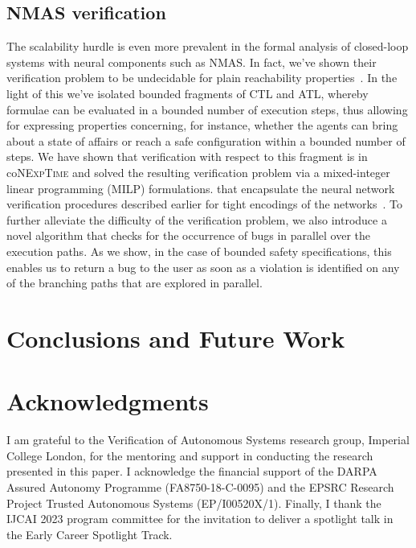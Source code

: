 \documentclass{article}
\newcommand{\conexptime}{co\nexptime}
\newcommand{\nexptime}{\textsc{NExpTime}\xspace}
\begin{document}
\subsection{NMAS verification} The scalability hurdle is even more prevalent in the
formal analysis of closed-loop systems with neural components such as NMAS. In
fact, we've shown their verification problem to be undecidable for plain
reachability properties~\cite{Akintunde+22}. In the light of this we've isolated
bounded fragments of CTL and ATL,  whereby formulae can be evaluated in a
bounded number of execution steps, thus allowing for expressing properties
concerning, for instance, whether the agents can bring about a state of affairs
or reach a safe configuration within a bounded number of steps. We have shown
that verification with respect to this fragment is in \conexptime and solved the
resulting verification problem via a mixed-integer linear programming (MILP)
formulations.  that encapsulate the neural network verification procedures
described earlier for tight encodings of the
networks~\cite{Akintunde+20,Akintunde+20b}. 
To further alleviate the difficulty of the verification problem, we
also introduce a novel algorithm that checks for the occurrence of
bugs in parallel over the execution paths. As we show, in the case
of bounded safety specifications, this enables us to return a bug to
the user as soon as a violation is identified on any of the branching
paths that are explored in parallel.



\section{Conclusions and Future Work}



\section*{Acknowledgments}

I am grateful to the Verification of Autonomous Systems research group, Imperial
College London, for the mentoring and support in conducting the research
presented in this paper. I acknowledge the financial support of the DARPA
Assured Autonomy Programme (FA8750-18-C-0095) and the EPSRC Research Project
Trusted Autonomous Systems (EP/I00520X/1). Finally, I thank the IJCAI 2023 program
committee for the  invitation to deliver a spotlight talk in the Early Career
Spotlight Track.





\end{document}
